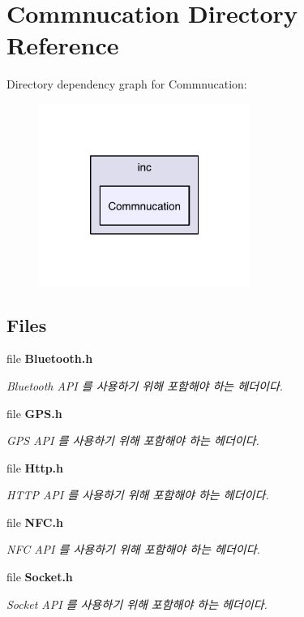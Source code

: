 \section{Commnucation Directory Reference}
\label{dir_0a03bbb93003c025bb5dd467474c2960}
Directory dependency graph for Commnucation\-:\nopagebreak
\begin{figure}[H]
\begin{center}
\leavevmode
\includegraphics[width=196pt]{dir_0a03bbb93003c025bb5dd467474c2960_dep}
\end{center}
\end{figure}
\subsection*{Files}
\begin{DoxyCompactItemize}
\item 
file {\bf Bluetooth.\-h}
\begin{DoxyCompactList}\small\item\em Bluetooth A\-P\-I 를 사용하기 위해 포함해야 하는 헤더이다. \end{DoxyCompactList}\item 
file {\bf G\-P\-S.\-h}
\begin{DoxyCompactList}\small\item\em G\-P\-S A\-P\-I 를 사용하기 위해 포함해야 하는 헤더이다. \end{DoxyCompactList}\item 
file {\bf Http.\-h}
\begin{DoxyCompactList}\small\item\em H\-T\-T\-P A\-P\-I 를 사용하기 위해 포함해야 하는 헤더이다. \end{DoxyCompactList}\item 
file {\bf N\-F\-C.\-h}
\begin{DoxyCompactList}\small\item\em N\-F\-C A\-P\-I 를 사용하기 위해 포함해야 하는 헤더이다. \end{DoxyCompactList}\item 
file {\bf Socket.\-h}
\begin{DoxyCompactList}\small\item\em Socket A\-P\-I 를 사용하기 위해 포함해야 하는 헤더이다. \end{DoxyCompactList}\end{DoxyCompactItemize}
